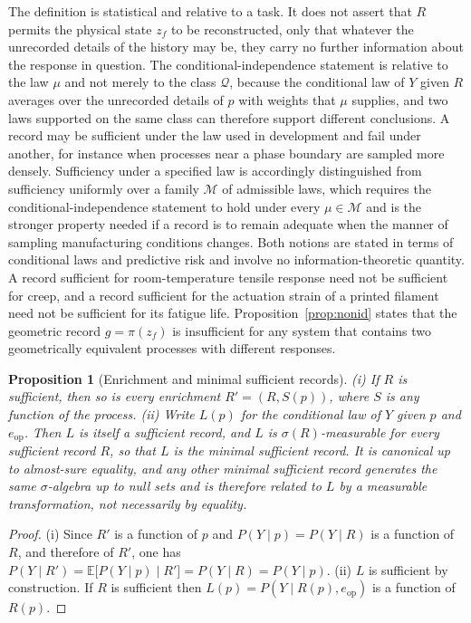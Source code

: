 \documentclass[11pt]{article}
\newtheorem{proposition}{Proposition}
\theoremstyle{definition}
\begin{document}
The definition is statistical and relative to a task. It does not assert that $R$ permits the physical state $z_f$ to be reconstructed, only that whatever the unrecorded details of the history may be, they carry no further information about the response in question. The conditional-independence statement is relative to the law $\mu$ and not merely to the class $\mathcal{Q}$, because the conditional law of $Y$ given $R$ averages over the unrecorded details of $p$ with weights that $\mu$ supplies, and two laws supported on the same class can therefore support different conclusions. A record may be sufficient under the law used in development and fail under another, for instance when processes near a phase boundary are sampled more densely. Sufficiency under a specified law is accordingly distinguished from sufficiency uniformly over a family $\mathcal{M}$ of admissible laws, which requires the conditional-independence statement to hold under every $\mu\in\mathcal{M}$ and is the stronger property needed if a record is to remain adequate when the manner of sampling manufacturing conditions changes. Both notions are stated in terms of conditional laws and predictive risk and involve no information-theoretic quantity. A record sufficient for room-temperature tensile response need not be sufficient for creep, and a record sufficient for the actuation strain of a printed filament need not be sufficient for its fatigue life. Proposition~\ref{prop:nonid} states that the geometric record $g=\pi(z_f)$ is insufficient for any system that contains two geometrically equivalent processes with different responses.

\begin{proposition}[Enrichment and minimal sufficient records]
\label{prop:suff}
(i) If $R$ is sufficient, then so is every enrichment $R'=(R,S(p))$, where $S$ is any function of the process. (ii) Write $L(p)$ for the conditional law of $Y$ given $p$ and $e_{\mathrm{op}}$. Then $L$ is itself a sufficient record, and $L$ is $\sigma(R)$-measurable for every sufficient record $R$, so that $L$ is the minimal sufficient record. It is canonical up to almost-sure equality, and any other minimal sufficient record generates the same $\sigma$-algebra up to null sets and is therefore related to $L$ by a measurable transformation, not necessarily by equality.
\end{proposition}

\begin{proof}
(i) Since $R'$ is a function of $p$ and $P(Y\mid p)=P(Y\mid R)$ is a function of $R$, and therefore of $R'$, one has $P(Y\mid R')=\mathbb{E}\bigl[P(Y\mid p)\mid R'\bigr]=P(Y\mid R)=P(Y\mid p)$. (ii) $L$ is sufficient by construction. If $R$ is sufficient then $L(p)=P(Y\mid R(p),e_{\mathrm{op}})$ is a function of $R(p)$. \qedhere
\end{proof}
\end{document}
